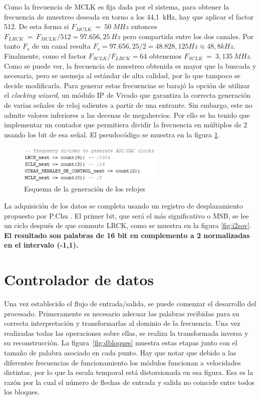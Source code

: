 Como la frecuencia de MCLK es fija dada por el sistema, para obtener la frecuencia de muestreo deseada en torno a los 44,1~kHz, hay que aplicar el factor 512. De esta forma si $F_{MCLK}~=~50~MHz$ entonces $F_{LRCK}~=~F_{MCLK}/512 = 97.656,25~Hz$ pero compartida entre los dos canales. Por tanto $F_{s}$ de un canal resulta $F_{s} = 97.656,25/2 = 48.828,125 Hz \approx 48,8 kHz$. Finalmente, como el factor $F_{SCLK}/F_{LRCK}=64$ obtenemos $F_{SCLK}~=~3,135~MHz$. Como se puede ver, la frecuencia de muestreo obtenida es mayor que la buscada y necesaria, pero se asemeja al estándar de alta calidad, por lo que tampoco se decide modificarla. Para generar estas frecuencias se barajó la opción de utilizar el \emph{clocking wizard}, un módulo IP de Vivado que garantiza la correcta generación de varias señales de reloj salientes a partir de una entrante. Sin embargo, este no admite valores inferiores a las decenas de megahercios. Por ello se ha tenido que implementar un contador que permitiera dividir la frecuencia en múltiplos de 2 usando los bit de esa señal. El pseudocódigo se muestra en la figura \ref{fig:controlsig}.

\begin{figure}[!h]
\begin{center}
\includegraphics[width=7cm]{img/controlsig.png}
\caption{\label{fig:controlsig}Esquema de la generación de los relojes}
\end{center}
\end{figure}

La adquisición de los datos se completa usando un registro de desplazamiento propuesto por P.Chu \cite{vhdlchu}. El primer bit, que será el más significativo o MSB, se lee un ciclo después de que conmute LRCK, como se muestra en la figura \ref{fig:i2sov}. \textbf{El resultado son palabras de 16 bit en complemento a 2 normalizadas en el intervalo (-1,1).}

\section{Controlador de datos}
Una vez establecido el flujo de entrada/salida, se puede comenzar el desarrollo del procesado. Primeramente es necesario adecuar las palabras recibidas para su correcta interpretación y transformarlas al dominio de la frecuencia. Una vez realizadas todas las operaciones sobre ellas, se realiza la transformada inversa y su reconstrucción. La figura~\ref{fig:dbloques} muestra estas etapas junto con el tamaño de palabra asociado en cada punto. Hay que notar que debido a las diferentes frecuencias de funcionamiento los módulos funcionan a velocidades distintas, por lo que la escala temporal está distorsionada en esa figura. Esa es la razón por la cual el número de flechas de entrada y salida no coincide entre todos los bloques.

